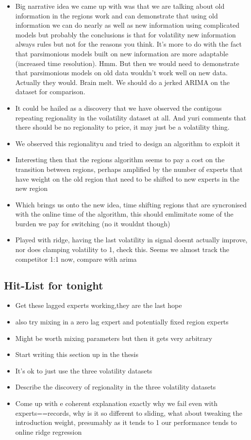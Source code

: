 \documentclass[envcountsame]{llncs}
\begin{document}
\begin{itemize}
\item Big narrative idea we came up with was that we are talking about old information in the regions work and can demonstrate that using old information we can do nearly as well as new information using complicated models but probably the conclusions is that for volatility new information always rules but not for the reasons you think. It's more to do with the fact that parsimonious models built on new information are more adaptable (increased time resolution). Hmm. But then we would need to demonstrate that parsimonious models on old data wouldn't work well on new data. Actually they would. Brain melt. We should do a jerked ARIMA on the dataset for comparison. 
\item It could be hailed as a discovery that we have observed the contigous repeating regionality in the voilatility dataset at all. And yuri comments that there should be no regionality to price, it may just be a volatility thing. 
\item We observed this regionalityu and tried to design an algorithm to exploit it
\item Interesting then that the regions algorithm seems to pay a cost on the transition between regions, perhaps amplified by the number of experts that have weight on the old region that need to be shifted to new experts in the new region
\item Which brings us onto the new idea, time shifting regions that are syncronised with the online time of the algorithm, this should emlimitate some of the burden we pay for switching (no it wouldnt though)
\item Played with ridge, having the last volatility in signal doesnt actually improve, nor does clamping volatility to 1, check this. Seems we almost track the competitor 1:1 now, compare with arima

\end{itemize}

\subsection{Hit-List for tonight}

\begin{itemize}
\item Get these lagged experts working,they are the last hope
\item also try mixing in a zero lag expert and potentially fixed region experts
\item Might be worth mixing parameters but then it gets very arbitrary
\item Start writing this section up in the thesis
\item It's ok to just use the three volatility datasets
\item Describe the discovery of regionality in the three volatility datasets
\item Come up with e coherent explanation exactly why we fail even with experts==records, why is it so different to sliding, what about tweaking the introduction weight, presumably as it tends to 1 our performance tends to online ridge regression
\end{itemize}
\end{document}
